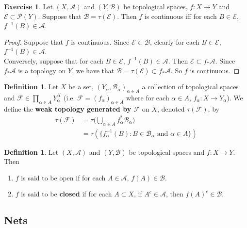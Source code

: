 \documentclass[12pt]{amsart}
\theoremstyle{definition}
\newtheorem{defn}[definition]{Definition}
\newtheorem{ex}[definition]{Exercise}
\newcommand{\al}{\alpha}
\newcommand{\MA}{\mathcal{A}}
\newcommand{\MB}{\mathcal{B}}
\newcommand{\MF}{\mathcal{F}}
\newcommand{\MP}{\mathcal{P}}
\newcommand{\ME}{\mathcal{E}}
\newcommand{\lex}[1]{\label{ex:#1}}
\newcommand{\ld}[1]{\label{defn:#1}}
\begin{document}
	\begin{ex} \lex{}
	Let $(X,\MA)$ and $(Y,\MB)$ be topological spaces, $f:X \rightarrow Y$ and $\ME \subset \MP(Y)$. Suppose that $\MB = \tau(\ME)$. Then $f$ is continuous iff for each $B \in \ME$, $f^{-1}(B) \in \MA$.
	\end{ex}
	
	\begin{proof}
	Suppose that $f$ is continuous. Since $\ME \subset \MB$, clearly for each $B \in \ME$, $f^{-1}(B) \in \MA$. \\
	Conversely, suppose that for each $B \in \ME$, $f^{-1}(B) \in \MA$. Then $\ME \subset f_*\MA$. Since $f_*\MA$ is a topology on $Y$, we have that $\MB = \tau(\ME) \subset f_*\MA$. So $f$ is continuous.
	\end{proof}
	
	\begin{defn} \ld{}
	Let $X$ be a set, $(Y_{\al}, \MB_{\al})_{\al \in A}$ a collection of topological spaces and $\MF \in \prod \limits_{\al \in A}Y_{\al}^X$ (i.e. $\MF = (f_{\al})_{\al \in A}$ where for each $\al \in A$, $f_{\al}:X \rightarrow Y_{\al}$). We define the \textbf{weak topology generated by $\MF$} on $X$, denoted $\tau(\MF)$, by 
	\begin{align*}
	\tau(\MF) 
	&= \tau \bigg( \bigcup\limits_{\al \in A}f_{\al}^*\MB_{\al} \bigg) \\
	&= \tau(\{f_{\al}^{-1}(B): B \in \MB_{\al} \text{ and } \al \in A \})
\end{align*}	 
	\end{defn}
	
	\begin{defn} \ld{}
		Let $(X,\MA)$ and $(Y,\MB)$ be topological spaces and $f:X \rightarrow Y$. Then 
		\begin{enumerate}
			\item $f$ is said to be open if for each $A \in \MA$, $f(A) \in \MB$.
			\item $f$ is said to be \textbf{closed} if for each $A \subset X$, if $A^c \in \MA$, then $f(A)^c \in \MB$. 
		\end{enumerate}
	\end{defn}
	
	













\newpage
\subsection{Nets}	
\end{document}
